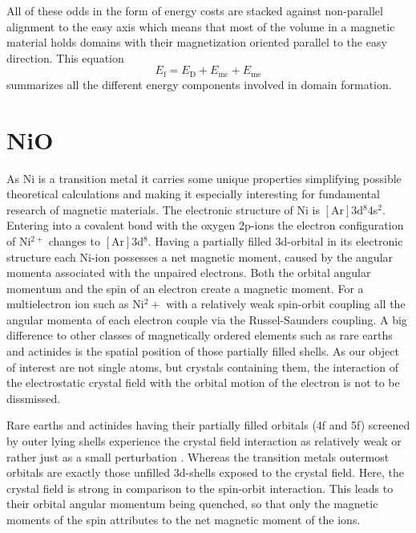 All of these odds in the form of energy costs are stacked against non-parallel alignment to the easy axis which means that most of the volume in a magnetic material holds domains with their magnetization oriented parallel to the easy direction.
This equation
\begin{equation}
    E_{\text{f}} = E_{\text{D}} + E_{\text{mc}} + E_{\text{me}}
    \label{eqn:landau_lifschitz_energy}
\end{equation}
summarizes all the different energy components involved in domain formation.



\section{NiO}
As Ni is a transition metal it carries some unique properties simplifying possible theoretical calculations and making it especially interesting for fundamental research of magnetic materials.
The electronic structure of Ni is $[\text{Ar}]3$d$^8 4$s$^2$.
Entering into a covalent bond with the oxygen 2p-ions the electron configuration of Ni$^{2+}$ changes to $[\text{Ar}]3$d$^8$.
Having a partially filled 3d-orbital in its electronic structure each Ni-ion possesses a net magnetic moment, caused by the angular momenta associated with the unpaired electrons.
Both the orbital angular momentum and the spin of an electron create a magnetic moment.
For a multielectron ion such as Ni$^2+$ with a relatively weak spin-orbit coupling all the angular momenta of each electron couple via the Russel-Saunders coupling.
A big difference to other classes of magnetically ordered elements such as rare earths and actinides is the spatial position of those partially filled shells.
As our object of interest are not single atoms, but crystals containing them, the interaction of the electrostatic crystal field with the orbital motion of the electron is not to be dissmissed.

Rare earths and actinides having their partially filled orbitals (4f and 5f) screened by outer lying shells experience the crystal field interaction as relatively weak or rather just as a small perturbation .
Whereas the transition metals outermost orbitals are exactly those unfilled 3d-shells exposed to the crystal field.
Here, the crystal field is strong in comparison to the spin-orbit interaction.
This leads to their orbital angular momentum being quenched, so that only the magnetic moments of the spin attributes to the net magnetic moment of the ions.

